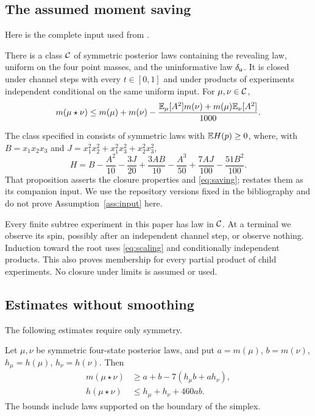 \subsection{The assumed moment saving}
Here is the complete input used from \cite{Threshold,Capacity}.

\begin{assumption}\label{ass:input}
There is a class $\mathcal C$ of symmetric posterior laws containing the
revealing law, uniform on the four point masses, and the uninformative
law $\delta_\mathsf u$. It is closed under channel steps with every
$t\in[0,1]$ and under products of experiments independent conditional
on the same uniform input. For $\mu,\nu\in\mathcal C$,
\begin{equation}\label{eq:saving}
 m(\mu\star\nu)\leq m(\mu)+m(\nu)
 -\frac{\mathbb E_\mu[A^2]m(\nu)+m(\mu)\mathbb E_\nu[A^2]}{1000}.
\end{equation}
\end{assumption}

The class specified in \cite[Proposition 3.2]{Threshold} consists of
symmetric laws with $\mathbb E H(p)\geq0$, where, with
$B=x_1x_2x_3$ and $J=x_1^2x_2^2+x_1^2x_3^2+x_2^2x_3^2$,
\begin{equation}\label{eq:cone}
 H=B-\frac{A^2}{10}-\frac{3J}{20}+\frac{3AB}{10}
       -\frac{A^3}{50}+\frac{7AJ}{100}-\frac{51B^2}{100}.
\end{equation}
That proposition asserts the closure properties and
\eqref{eq:saving}; \cite{Capacity} restates them as its companion
input. We use the repository versions fixed in the bibliography and
do not prove Assumption~\ref{ass:input} here.

Every finite subtree experiment in this paper has law in $\mathcal C$.
At a terminal we observe its spin, possibly after an independent
channel step, or observe nothing. Induction toward the root uses
\eqref{eq:scaling} and conditionally independent products. This also
proves membership for every partial product of child experiments.
No closure under limits is assumed or used.

\subsection{Estimates without smoothing}
The following estimates require only symmetry.

\begin{lemma}\label{lem:local}
Let $\mu,\nu$ be symmetric four-state posterior laws, and put
$a=m(\mu)$, $b=m(\nu)$, $h_\mu=h(\mu)$, $h_\nu=h(\nu)$.
Then
\begin{align}
 m(\mu\star\nu)&\geq a+b-7(h_\mu b+a h_\nu),\label{eq:local-m}\\
 h(\mu\star\nu)&\leq h_\mu+h_\nu+460ab.\label{eq:local-h}
\end{align}
The bounds include laws supported on the boundary of the simplex.
\end{lemma}

